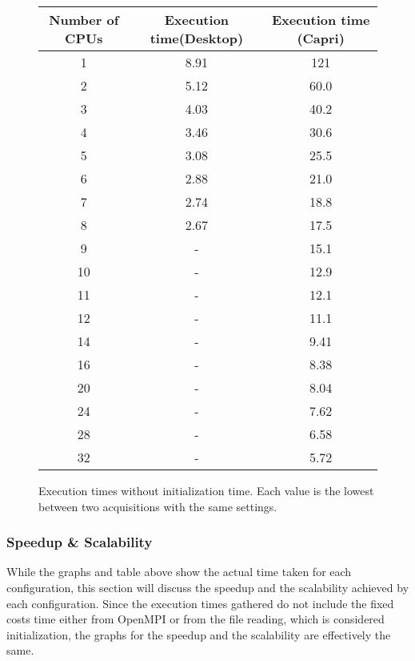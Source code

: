 \documentclass[a4paper]{article}
\begin{document}
\begin{figure}[H]
	\centering
	\begin{tabular}{|c | c | c|} 
		\hline
		Number of CPUs & Execution time(Desktop) & Execution time (Capri) \\ [0.5ex] 
		\hline%
		1 & 8.91 & 121 \\ 
		\hline
		2 & 5.12 & 60.0 \\
		\hline
		3 & 4.03 & 40.2 \\
		\hline
		4 & 3.46 & 30.6 \\
		\hline
		5 & 3.08 & 25.5 \\
		\hline
		6 & 2.88 & 21.0 \\
		\hline
		7 & 2.74 & 18.8 \\
		\hline
		8 & 2.67 & 17.5 \\
		\hline
		9 & - & 15.1 \\
		\hline
		10 & - & 12.9 \\
		\hline
		11 & - & 12.1 \\
		\hline
		12 & - & 11.1 \\
		\hline
		14 & - & 9.41 \\
		\hline
		16 & - & 8.38 \\
		\hline
		20 & - & 8.04 \\
		\hline
		24 & - & 7.62 \\
		\hline
		28 & - & 6.58 \\
		\hline
		32 & - & 5.72 \\
		\hline
	\end{tabular}
	\caption{Execution times without initialization time. Each value is the lowest between two acquisitions with the same settings.}
\end{figure}

\subsubsection{Speedup \& Scalability}

While the graphs and table above show the actual time taken for each configuration, this section will discuss the speedup and the scalability achieved by each configuration.
Since the execution times gathered do not include the fixed costs time either from OpenMPI or from the file reading, which is considered initialization, the graphs for the speedup and the scalability are effectively the same.
\end{document}
